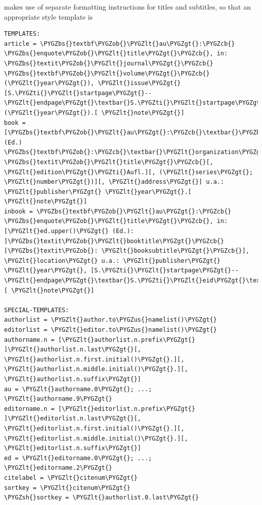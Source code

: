 \documentclass[letterpaper,10pt,english]{sphinxmanual}
\def\PYGZbs{\char`\\}
\def\PYGZus{\char`\_}
\def\PYGZob{\char`\{}
\def\PYGZcb{\char`\}}
\def\PYGZlt{\char`\<}
\def\PYGZgt{\char`\>}
\def\PYGZsh{\char`\#}
\def\PYGZti{\char`\~}
\begin{document}
makes use of separate formatting instructions for titles and subtitles, so that an appropriate style template is

\begin{Verbatim}[commandchars=\\\{\}]
TEMPLATES:
article = \PYGZbs{}textbf\PYGZob{}\PYGZlt{}au\PYGZgt{}:\PYGZcb{} \PYGZbs{}enquote\PYGZob{}\PYGZlt{}title\PYGZgt{}\PYGZcb{}, in: \PYGZbs{}textit\PYGZob{}\PYGZlt{}journal\PYGZgt{}\PYGZcb{} \PYGZbs{}textbf\PYGZob{}\PYGZlt{}volume\PYGZgt{}\PYGZcb{} (\PYGZlt{}year\PYGZgt{}), \PYGZlt{}issue\PYGZgt{} [S.\PYGZti{}\PYGZlt{}startpage\PYGZgt{}--\PYGZlt{}endpage\PYGZgt{}\textbar{}S.\PYGZti{}\PYGZlt{}startpage\PYGZgt{}\textbar{}\PYGZlt{}eid\PYGZgt{}\textbar{}] (\PYGZlt{}year\PYGZgt{}).[ \PYGZlt{}note\PYGZgt{}]
book = [\PYGZbs{}textbf\PYGZob{}\PYGZlt{}au\PYGZgt{}:\PYGZcb{}\textbar{}\PYGZbs{}textbf\PYGZob{}\PYGZlt{}ed\PYGZgt{}\PYGZcb{} (Ed.) \PYGZbs{}textbf\PYGZob{}:\PYGZcb{}\textbar{}\PYGZlt{}organization\PYGZgt{}\textbar{}\PYGZlt{}institution\PYGZgt{}\textbar{}], \PYGZbs{}textit\PYGZob{}\PYGZlt{}title\PYGZgt{}\PYGZcb{}[, \PYGZlt{}edition\PYGZgt{}\PYGZti{}Aufl.][, (\PYGZlt{}series\PYGZgt{}; \PYGZlt{}number\PYGZgt{})][, \PYGZlt{}address\PYGZgt{}] u.a.: \PYGZlt{}publisher\PYGZgt{} \PYGZlt{}year\PYGZgt{}.[ \PYGZlt{}note\PYGZgt{}]
inbook = \PYGZbs{}textbf\PYGZob{}\PYGZlt{}au\PYGZgt{}:\PYGZcb{} \PYGZbs{}enquote\PYGZob{}\PYGZlt{}title\PYGZgt{}\PYGZcb{}, in: [\PYGZlt{}ed.upper()\PYGZgt{} (Ed.): ]\PYGZbs{}textit\PYGZob{}\PYGZlt{}booktitle\PYGZgt{}\PYGZcb{}[\PYGZbs{}textit\PYGZob{}: \PYGZlt{}booksubtitle\PYGZgt{}\PYGZcb{}], \PYGZlt{}location\PYGZgt{} u.a.: \PYGZlt{}publisher\PYGZgt{} \PYGZlt{}year\PYGZgt{}, [S.\PYGZti{}\PYGZlt{}startpage\PYGZgt{}--\PYGZlt{}endpage\PYGZgt{}\textbar{}S.\PYGZti{}\PYGZlt{}eid\PYGZgt{}\textbar{}].[ \PYGZlt{}note\PYGZgt{}]

SPECIAL-TEMPLATES:
authorlist = \PYGZlt{}author.to\PYGZus{}namelist()\PYGZgt{}
editorlist = \PYGZlt{}editor.to\PYGZus{}namelist()\PYGZgt{}
authorname.n = [\PYGZlt{}authorlist.n.prefix\PYGZgt{} ]\PYGZlt{}authorlist.n.last\PYGZgt{}[, \PYGZlt{}authorlist.n.first.initial()\PYGZgt{}.][, \PYGZlt{}authorlist.n.middle.initial()\PYGZgt{}.][, \PYGZlt{}authorlist.n.suffix\PYGZgt{}]
au = \PYGZlt{}authorname.0\PYGZgt{}; ...; \PYGZlt{}authorname.9\PYGZgt{}
editorname.n = [\PYGZlt{}editorlist.n.prefix\PYGZgt{} ]\PYGZlt{}editorlist.n.last\PYGZgt{}[, \PYGZlt{}editorlist.n.first.initial()\PYGZgt{}.][, \PYGZlt{}editorlist.n.middle.initial()\PYGZgt{}.][, \PYGZlt{}editorlist.n.suffix\PYGZgt{}]
ed = \PYGZlt{}editorname.0\PYGZgt{}; ...; \PYGZlt{}editorname.2\PYGZgt{}
citelabel = \PYGZlt{}citenum\PYGZgt{}
sortkey = \PYGZlt{}citenum\PYGZgt{}
\PYGZsh{}sortkey = \PYGZlt{}authorlist.0.last\PYGZgt{}


\end{Verbatim}
\end{document}
